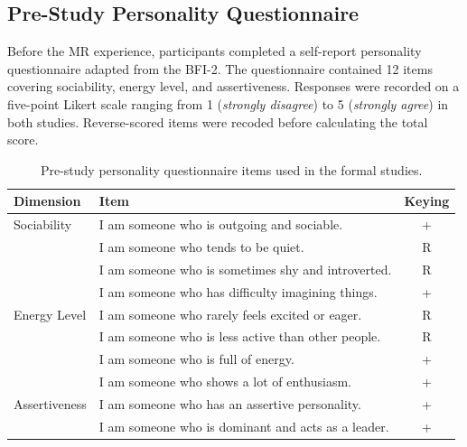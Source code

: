\documentclass[a4paper,fleqn]{cas-sc}
\begin{document}
\subsection{Pre-Study Personality Questionnaire}
\label{app:pretest}

Before the MR experience, participants completed a self-report personality questionnaire adapted from the BFI-2. 
The questionnaire contained 12 items covering sociability, energy level, and assertiveness. 
Responses were recorded on a five-point Likert scale ranging from 1 (\textit{strongly disagree}) to 5 (\textit{strongly agree}) in both studies. 
Reverse-scored items were recoded before calculating the total score.

\begin{table}[t]
\centering
\footnotesize
\caption{Pre-study personality questionnaire items used in the formal studies.}
\label{tab:app-pretest}
\begin{tabular}{p{}p{}c}
\toprule
\textbf{Dimension} &
\textbf{Item} &
\textbf{Keying} \\
\midrule

Sociability &
I am someone who is outgoing and sociable. &
+ \\

&
I am someone who tends to be quiet. &
R \\

&
I am someone who is sometimes shy and introverted. &
R \\

&
I am someone who has difficulty imagining things. &
+ \\

\addlinespace

Energy Level &
I am someone who rarely feels excited or eager. &
R \\

&
I am someone who is less active than other people. &
R \\

&
I am someone who is full of energy. &
+ \\

&
I am someone who shows a lot of enthusiasm. &
+ \\

\addlinespace

Assertiveness &
I am someone who has an assertive personality. &
+ \\

&
I am someone who is dominant and acts as a leader. &
+ \\


\end{tabular}
\end{table}
\end{document}
